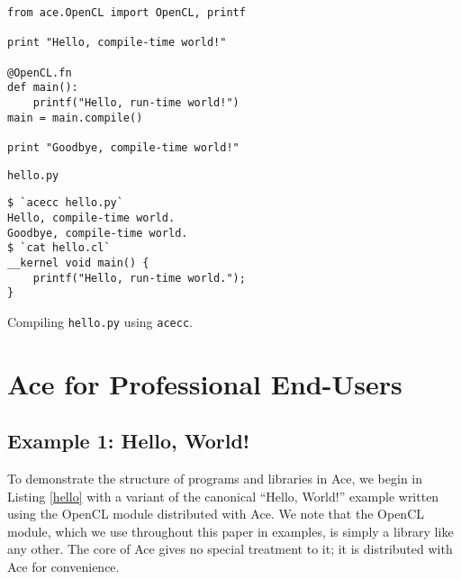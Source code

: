 \documentclass[10pt, conference, compsocconf]{IEEEtran}
\begin{document}
\begin{codelisting}
\begin{lstlisting}
from ace.OpenCL import OpenCL, printf
 
print "Hello, compile-time world!"
 
@OpenCL.fn
def main():
    printf("Hello, run-time world!")
main = main.compile()

print "Goodbye, compile-time world!"
\end{lstlisting}
\caption{\texttt{hello.py}}
\label{hello}
\end{codelisting}
\begin{codelisting}
\begin{lstlisting}[style=Bash]
$ `acecc hello.py`
Hello, compile-time world.
Goodbye, compile-time world.
$ `cat hello.cl`
__kernel void main() {
    printf("Hello, run-time world.");
}\end{lstlisting}
\caption{Compiling \texttt{hello.py} using \texttt{acecc}.}
\label{helloout}
\end{codelisting}

\section{Ace for Professional End-Users}
\subsection{Example 1: Hello, World!}
To demonstrate the structure of programs and libraries in Ace, we begin in Listing \ref{hello} with a variant of the canonical ``Hello, World!'' example written using the OpenCL module distributed with Ace. We note that the OpenCL module, which we use throughout this paper in examples, is simply a library like any other. The core of Ace gives no special treatment to it; it is distributed with Ace for convenience. 
\end{document}
